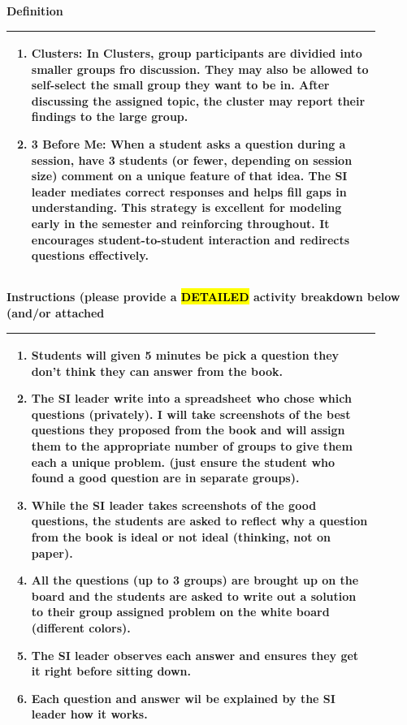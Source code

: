 \documentclass{article}
\begin{document}
\vspace{0.5cm}

{\large \textbf{Definition}} \\
\noindent
\begin{tabular}{|p{0.9\linewidth}|}
\hline
\begin{enumerate}
    \item \textbf{Clusters:} In Clusters, group participants are dividied into smaller groups fro discussion. They may also be allowed to self-select the small group they want to be in. After discussing the assigned topic, the cluster may report their findings to the large group.
    \item \textbf{3 Before Me:}  
    When a student asks a question during a session, have 3 students (or fewer, depending on session size) comment on a unique feature of that idea.  
    The SI leader mediates correct responses and helps fill gaps in understanding.  
    This strategy is excellent for modeling early in the semester and reinforcing throughout.  
    It encourages student-to-student interaction and redirects questions effectively.
\end{enumerate} \\
\hline
\end{tabular}
\vspace{0.2cm}
\newpage
{\large \textbf{Instructions (please provide a \hl{DETAILED} activity breakdown below (and/or attached}} \\
\noindent
\begin{tabular}{|p{0.9\linewidth}|}
\hline
\vspace{0.2cm}
\begin{enumerate}
    \item Students will given 5 minutes be pick a question they don't think they can answer from the book.
    \item The SI leader write into a spreadsheet who chose which questions (privately). I will take screenshots of the best questions they proposed from the book and will assign them to the appropriate number of groups to give them each a unique problem. (just ensure the student who found a good question are in separate groups).
    \item While the SI leader takes screenshots of the good questions, the students are asked to reflect why a question from the book is ideal or not ideal (thinking, not on paper).
    \item All the questions (up to 3 groups) are brought up on the board and the students are asked to write out a solution to their group assigned problem on the white board (different colors).
    \item The SI leader observes each answer and ensures they get it right before sitting down.
    \item Each question and answer wil be explained by the SI leader how it works.
\end{enumerate} \\
\hline
\end{tabular} \\
\end{document}
